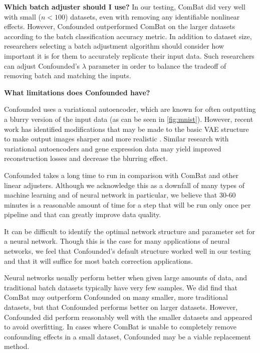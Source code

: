 \documentclass[11pt]{article}
\begin{document}
\textbf{Which batch adjuster should I use?}
In our testing, ComBat did very well with small ($n < 100$) datasets, even with removing any identifiable nonlinear effects.
However, Confounded outperformed ComBat on the larger datasets according to the batch classification accuracy metric.
In addition to dataset size, researchers selecting a batch adjustment algorithm should consider how important it is for them to accurately replicate their input data.
Such researchers can adjust Confounded's $\lambda$ parameter in order to balance the tradeoff of removing batch and matching the inputs.

\textbf{What limitations does Confounded have?}
\begin{enumerate*}[(a)]
	\item Confounded uses a variational autoencoder, which are known for often outputting a blurry version of the input data (as can be seen in \figurename{} \ref{fig:mnist}).
	However, recent work has identified modifications that may be made to the basic VAE structure to make output images sharper and more realistic \citep{hou_deep_2016}.
	Similar research with variational autoencoders and gene expression data may yield improved reconstruction losses and decrease the blurring effect.
	\item Confounded takes a long time to run in comparison with ComBat and other linear adjusters.
	Although we acknowledge this as a downfall of many types of machine learning and of neural network in particular, we believe that 30-60 minutes is a reasonable amount of time for a step that will be run only once per pipeline and that can greatly improve data quality.
	\item It can be difficult to identify the optimal network structure and parameter set for a neural network.
	Though this is the case for many applications of neural networks, we feel that Confounded's default structure worked well in our testing and that it will suffice for most batch correction applications.
	\item Neural networks usually perform better when given large amounts of data, and traditional batch datasets typically have very few samples.
	We did find that ComBat may outperform Confounded on many smaller, more traditional datasets, but that Confounded performs better on larger datasets.
	However, Confounded did perform reasonably well with the smaller datasets and appeared to avoid overfitting.
	In cases where ComBat is unable to completely remove confounding effects in a small dataset, Confounded may be a viable replacement method.
\end{enumerate*}
\end{document}
